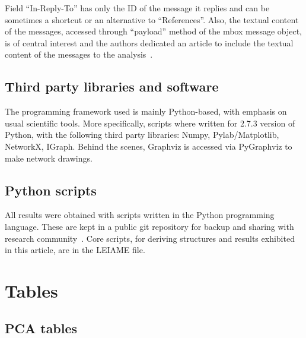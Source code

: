 \documentclass[%
 aip,
 jmp,%
 amsmath,amssymb,
 reprint,%
]{revtex4-1}
\begin{document}
Field ``In-Reply-To'' has only the ID of the message it replies and can be sometimes
a shortcut or an alternative to ``References''. Also, the textual content of the messages,
accessed through ``payload'' method of the mbox message object, is of central interest and
the authors dedicated an article to include the textual content of the messages to the analysis~\cite{rcText}.

\subsection{Third party libraries and software}
The programming framework used 
is mainly Python-based, with emphasis on usual
scientific tools. More specifically,
scripts where written for 2.7.3 version of Python,
with the following third party libraries: Numpy, Pylab/Matplotlib, NetworkX, IGraph.
Behind the scenes, Graphviz is accessed via PyGraphviz to make network drawings.

\subsection{Python scripts}\label{ap:os}
All results were obtained with scripts written in the Python programming language. These are kept in a public git repository for backup and sharing with research community~\cite{scriptsFim}. Core scripts, for deriving structures and results exhibited in this article, are in the LEIAME file.

\section{Tables}\label{sectables}
\clearpage
\subsection{PCA tables}\label{sec:pcat}
\end{document}
